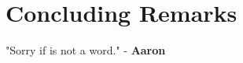 
\setcounter{chapter}{10}
\chapter{Concluding Remarks}
\large
"Sorry if  is not a word." - \textbf{Aaron}